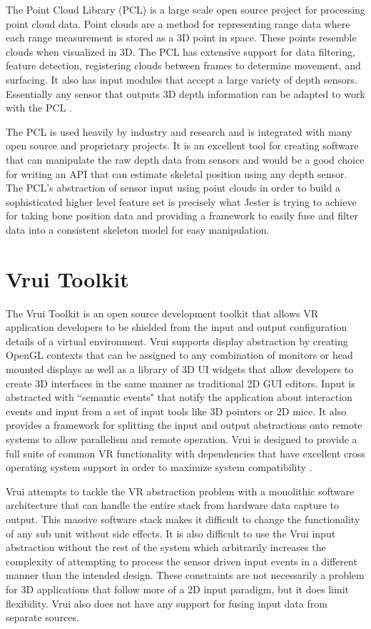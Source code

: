 The Point Cloud Library (PCL) is a large scale open source project for processing point cloud data. Point clouds are a method for representing range data where each range measurement is stored as a 3D point in space. These points resemble clouds when visualized in 3D. The PCL has extensive support for data filtering, feature detection, registering clouds between frames to determine movement, and surfacing. It also has input modules that accept a large variety of depth sensors. Essentially any sensor that outputs 3D depth information can be adapted to work with the PCL \cite{rusu20113d}.

The PCL is used heavily by industry and research and is integrated with many open source and proprietary projects. It is an excellent tool for creating software that can manipulate the raw depth data from sensors and would be a good choice for writing an API that can estimate skeletal position using any depth sensor. The PCL's abstraction of sensor input using point clouds in order to build a sophisticated higher level feature set is precisely what Jester is trying to achieve for taking bone position data and providing a framework to easily fuse and filter data into a consistent skeleton model for easy manipulation.

\section{Vrui Toolkit}

The Vrui Toolkit is an open source development toolkit that allows VR application developers to be shielded from the input and output configuration details of a virtual environment. Vrui supports display abstraction by creating OpenGL contexts that can be assigned to any combination of monitors or head mounted displays as well as a library of 3D UI widgets that allow developers to create 3D interfaces in the same manner as traditional 2D GUI editors. Input is abstracted with ``semantic events" that notify the application about interaction events and input from a set of input tools like 3D pointers or 2D mice. It also provides a framework for splitting the input and output abstractions onto remote systems to allow parallelism and remote operation. Vrui is designed to provide a full suite of common VR functionality with dependencies that have excellent cross operating system support in order to maximize system compatibility \cite{kreylos2008environment}. 

Vrui attempts to tackle the VR abstraction problem with a monolithic software architecture that can handle the entire stack from hardware data capture to output. This massive software stack makes it difficult to change the functionality of any sub unit without side effects. It is also difficult to use the Vrui input abstraction without the rest of the system which arbitrarily increases the complexity of attempting to process the sensor driven input events in a different manner than the intended design. These constraints are not necessarily a problem for 3D applications that follow more of a 2D input paradigm, but it does limit flexibility. Vrui also does not have any support for fusing input data from separate sources.

